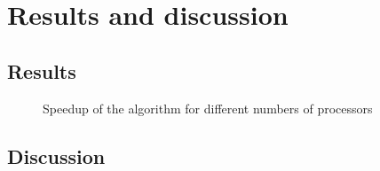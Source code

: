 \chapter{Results and discussion}

\section{Results}

\begin{figure}[h]
  \begin{center}
  \end{center}
  \caption{Speedup of the algorithm for different numbers of processors}
  \label{fig:graph}
\end{figure}

\section{Discussion}

